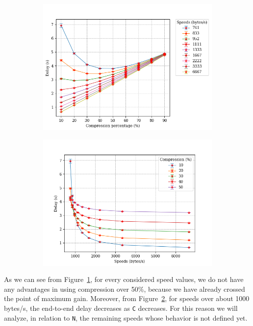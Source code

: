 \documentclass[11pt,a4paper,oneside, openright]{article}
\begin{document}
\begin{figure}[h]
\centering
\begin{subfigure}{.5\textwidth}
  \centering
  \includegraphics[width=\linewidth]{images/c-vs-delay-n-30}
  \caption{}
  \label{fig:c-vs-delay-n-30}
\end{subfigure}%
\begin{subfigure}{.5\textwidth}
  \centering
  \includegraphics[width=\linewidth]{images/s-vs-delay-n-30}
  \caption{}
  \label{fig:s-vs-delay-n-30}
\end{subfigure}
\caption{}
\label{fig:delay-n-30}
\end{figure}

As we can see from Figure~\ref{fig:c-vs-delay-n-30}, for every considered speed values, we do not have any advantages in using compression over 50\%, because we have already crossed the point of maximum gain. 
Moreover, from Figure~\ref{fig:s-vs-delay-n-30}, for speeds over about 1000 bytes/s, the end-to-end delay decreases as \texttt{C} decreases. For this reason we will analyze, in relation to \texttt{N}, the remaining speeds whose behavior is not defined yet.
\end{document}
